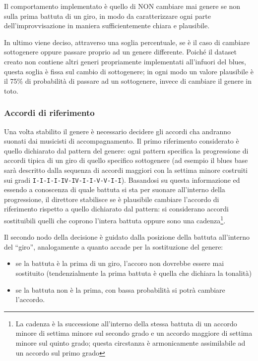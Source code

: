 Il comportamento implementato è quello di NON cambiare mai genere se non sulla prima battuta di un giro, in modo da caratterizzare ogni parte dell'improvvisazione in maniera sufficientemente chiara e plausibile. 

In ultimo viene deciso, attraverso una soglia percentuale, se è il caso di cambiare sottogenere oppure passare proprio ad un genere differente.
Poiché il dataset creato non contiene altri generi propriamente implementati all'infuori del blues, questa soglia è fissa sul cambio di sottogenere; in ogni modo un valore plausibile è il 75\% di probabilità di passare ad un sottogenere, invece di cambiare il genere in toto.

\subsubsection{Accordi di riferimento}
Una volta stabilito il genere è necessario decidere gli accordi cha andranno suonati dai musicisti di accompagnamento.
Il primo riferimento considerato è quello dichiarato dal pattern del genere: ogni pattern specifica la progressione di accordi tipica di un giro di quello specifico sottogenere (ad esempio il blues base sarà descritto dalla sequenza di accordi maggiori con la settima minore costruiti sui gradi \texttt{I-I-I-I-IV-IV-I-I-V-V-I-I}).
Basandosi su questa informazione ed essendo a conoscenza di quale battuta si sta per suonare all'interno della progressione, il direttore stabilisce se è plausibile cambiare l'accordo di riferimento rispetto a quello dichiarato dal pattern: si considerano accordi sostituibili quelli che coprono l'intera battuta oppure sono una cadenza\footnote{La cadenza è la successione all'interno della stessa battuta di un accordo minore di settima minore sul secondo grado e un accordo maggiore di settima minore sul quinto grado; questa circstanza è armonicamente assimilabile ad un accordo sul primo grado}.

Il secondo nodo della decisione è guidato dalla posizione della battuta all'interno del ``giro'', analogamente a quanto accade per la sostituzione del genere:
\begin{itemize}
\item se la battuta è la prima di un giro, l'accoro non dovrebbe essere mai sostituito (tendenzialmente la prima battuta è quella che dichiara la tonalità)
\item se la battuta non è la prima, con bassa probabilità si potrà cambiare l'accordo.
\end{itemize}

